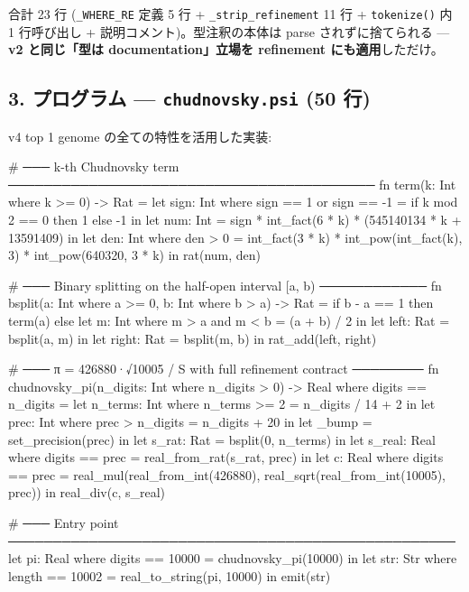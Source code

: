 \documentclass[
]{ltjsarticle}
\newenvironment{Shaded}{}{}
\newcommand{\NormalTok}[1]{#1}
\begin{document}
合計 23 行 (\texttt{\_WHERE\_RE} 定義 5 行 +
\texttt{\_strip\_refinement} 11 行 + \texttt{tokenize()} 内 1 行呼び出し
+ 説明コメント)。型注釈の本体は parse されずに捨てられる --- \textbf{v2
と同じ「型は documentation」立場を refinement にも適用}しただけ。

\subsection{\texorpdfstring{3. プログラム --- \texttt{chudnovsky.psi}
(50
行)}{3. プログラム --- chudnovsky.psi (50 行)}}\label{ux30d7ux30edux30b0ux30e9ux30e0-chudnovsky.psi-50-ux884c}

v4 top 1 genome の全ての特性を活用した実装:

\begin{Shaded}
\begin{Highlighting}[]
\NormalTok{\# ─── k{-}th Chudnovsky term ─────────────────────────────────────────}
\NormalTok{fn term(k: Int where k \textgreater{}= 0) {-}\textgreater{} Rat =}
\NormalTok{  let sign: Int where sign == 1 or sign == {-}1 =}
\NormalTok{    if k mod 2 == 0 then 1 else {-}1 in}
\NormalTok{  let num: Int = sign * int\_fact(6 * k) * (545140134 * k + 13591409) in}
\NormalTok{  let den: Int where den \textgreater{} 0 =}
\NormalTok{    int\_fact(3 * k) * int\_pow(int\_fact(k), 3) * int\_pow(640320, 3 * k) in}
\NormalTok{  rat(num, den)}

\NormalTok{\# ─── Binary splitting on the half{-}open interval [a, b) ────────────}
\NormalTok{fn bsplit(a: Int where a \textgreater{}= 0, b: Int where b \textgreater{} a) {-}\textgreater{} Rat =}
\NormalTok{  if b {-} a == 1 then term(a)}
\NormalTok{  else}
\NormalTok{    let m: Int where m \textgreater{} a and m \textless{} b = (a + b) / 2 in}
\NormalTok{    let left:  Rat = bsplit(a, m) in}
\NormalTok{    let right: Rat = bsplit(m, b) in}
\NormalTok{    rat\_add(left, right)}

\NormalTok{\# ─── π = 426880·√10005 / S  with full refinement contract ────────}
\NormalTok{fn chudnovsky\_pi(n\_digits: Int where n\_digits \textgreater{} 0)}
\NormalTok{                  {-}\textgreater{} Real where digits == n\_digits =}
\NormalTok{  let n\_terms: Int where n\_terms \textgreater{}= 2 = n\_digits / 14 + 2 in}
\NormalTok{  let prec:    Int where prec \textgreater{} n\_digits = n\_digits + 20 in}
\NormalTok{  let \_bump = set\_precision(prec) in}
\NormalTok{  let s\_rat:  Rat = bsplit(0, n\_terms) in}
\NormalTok{  let s\_real: Real where digits == prec = real\_from\_rat(s\_rat, prec) in}
\NormalTok{  let c:      Real where digits == prec =}
\NormalTok{    real\_mul(real\_from\_int(426880),}
\NormalTok{              real\_sqrt(real\_from\_int(10005), prec)) in}
\NormalTok{  real\_div(c, s\_real)}

\NormalTok{\# ─── Entry point ──────────────────────────────────────────────────}
\NormalTok{let pi:  Real where digits == 10000 = chudnovsky\_pi(10000) in}
\NormalTok{let str: Str  where length == 10002 = real\_to\_string(pi, 10000) in}
\NormalTok{emit(str)}
\end{Highlighting}
\end{Shaded}
\end{document}

